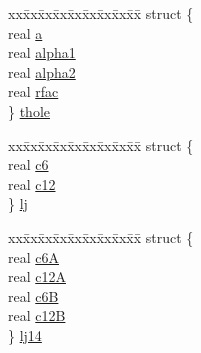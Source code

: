 \begin{DoxyCompactItemize}
\begin{tabbing}
\end{tabbing}\item 
\begin{tabbing}
xx\=xx\=xx\=xx\=xx\=xx\=xx\=xx\=xx\=\kill
struct \{\\
\>real \hyperlink{uniont__iparams_a070fd67041cc597a6c1ec5efeee18969}{a}\\
\>real \hyperlink{uniont__iparams_a4a17aad446da736ce31b69de32ec45ee}{alpha1}\\
\>real \hyperlink{uniont__iparams_a97862f1feb358ba5895a61cebf5a8063}{alpha2}\\
\>real \hyperlink{uniont__iparams_ab19837224898593491ecd78738cfe523}{rfac}\\
\} \hyperlink{uniont__iparams_a9930907b91b5a589a77454c1410ad6bf}{thole}\\

\end{tabbing}\item 
\begin{tabbing}
xx\=xx\=xx\=xx\=xx\=xx\=xx\=xx\=xx\=\kill
struct \{\\
\>real \hyperlink{uniont__iparams_ae0a64b8b583399113b65d1c5ec18a4fc}{c6}\\
\>real \hyperlink{uniont__iparams_a002c6e10a70be28bfb67d6c8e8d5c426}{c12}\\
\} \hyperlink{uniont__iparams_adc4c3df7d470468c935dbdd13242f8b9}{lj}\\

\end{tabbing}\item 
\begin{tabbing}
xx\=xx\=xx\=xx\=xx\=xx\=xx\=xx\=xx\=\kill
struct \{\\
\>real \hyperlink{uniont__iparams_a9f29164694f117d0d90699b916bf12e5}{c6A}\\
\>real \hyperlink{uniont__iparams_a2344777c6058fbdddb70ed30989ebc8a}{c12A}\\
\>real \hyperlink{uniont__iparams_a8a55bc3a5f007f519c6f5545f7ede08b}{c6B}\\
\>real \hyperlink{uniont__iparams_ac5329b0c789ca70c35648823a5bf0e2a}{c12B}\\
\} \hyperlink{uniont__iparams_a852db7106598eac1a6073e0fe606c8ee}{lj14}\\


\end{tabbing}
\end{DoxyCompactItemize}
